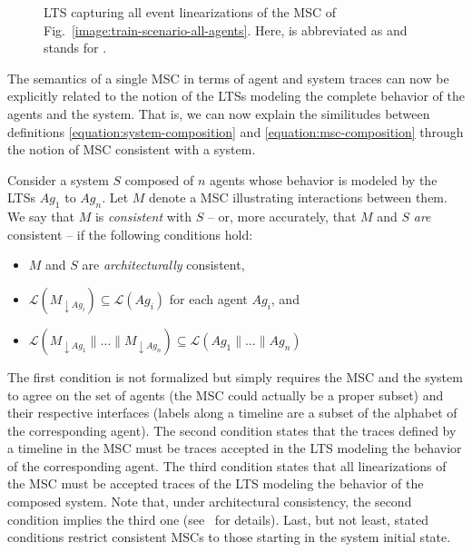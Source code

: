 \vspace{0.5cm}
\begin{figure}[H]\centering
{}
\caption{LTS capturing all event linearizations of the MSC of Fig.~\ref{image:train-scenario-all-agents}. Here,  is abbreviated as  and  stands for . \label{image:msc-linearizations}}
\end{figure}

The semantics of a single MSC in terms of agent and system traces can now be explicitly related to the notion of the LTSs modeling the complete behavior of the agents and the system. That is, we can now explain the similitudes between definitions \ref{equation:system-composition} and \ref{equation:msc-composition} through the notion of MSC consistent with a system. 

Consider a system $S$ composed of $n$ agents whose behavior is modeled by the LTSs $Ag_1$ to $Ag_n$. Let $M$ denote a MSC illustrating interactions between them. We say that $M$ is \emph{consistent} with $S$ -- or, more accurately, that $M$ and $S$ \emph{are} consistent -- if the following conditions hold:

\begin{itemize}
\item $M$ and $S$ are \emph{architecturally} consistent,
\item $\mathcal{L}(M_{\downarrow Ag_i}) \subseteq \mathcal{L}(Ag_i)$ for each agent $Ag_i$, and
\item $\mathcal{L}(M_{\downarrow Ag_1} \parallel \ldots \parallel M_{\downarrow Ag_n}) \subseteq \mathcal{L}(Ag_1 \parallel \ldots \parallel Ag_n)$
\end{itemize}

The first condition is not formalized but simply requires the MSC and the system to agree on the set of agents (the MSC could actually be a proper subset) and their respective interfaces (labels along a timeline are a subset of the alphabet of the corresponding agent). The second condition states that the traces defined by a timeline in the MSC must be traces accepted in the LTS modeling the behavior of the corresponding agent. The third condition states that all linearizations of the MSC must be accepted traces of the LTS modeling the behavior of the composed system. Note that, under architectural consistency, the second condition implies the third one (see~\cite{Uchitel:2003} for details). Last, but not least, stated conditions restrict consistent MSCs to those starting in the system initial state.

